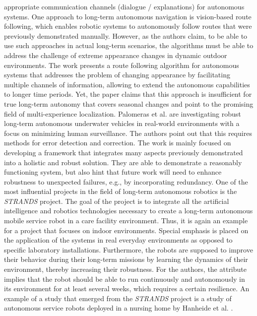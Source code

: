 \documentclass[english, master, utf8]{base/thesis_KBS}
\begin{document}
appropriate communication channels (dialogue / explanations) for autonomous systems.\newline
One approach to long-term autonomous navigation is vision-based route following, which enables robotic systems to autonomously follow routes that were previously demonstrated
manually. \cite{Paton:2016} However, as the authors claim, to be able to use such approaches in actual long-term scenarios, the algorithms must be able to address the challenge
of extreme appearance changes in dynamic outdoor environments. The work presents a route following algorithm for autonomous systems that addresses the problem of changing appearance
by facilitating multiple channels of information, allowing to extend the autonomous capabilities to longer time periods. Yet, the paper claims that this approach is insufficient for
true long-term autonomy that covers seasonal changes and point to the promising field of multi-experience localization.\newline
Palomeras et al. \cite{Palomeras:2016} are investigating robust long-term autonomous underwater vehicles in real-world environments with a focus on minimizing human surveillance.
The authors point out that this requires methods for error detection and correction. The work is mainly focused on developing a framework that integrates many aspects previously
demonstrated into a holistic and robust solution. They are able to demonstrate a reasonably functioning system, but also hint that future work will need to enhance robustness to
unexpected failures, e.g., by incorporating redundancy.\newline
One of the most influential projects in the field of long-term autonomous robotics is the \textit{STRANDS} \cite{Hawes:2017} project. The goal of the project is to integrate all the
artificial intelligence and robotics technologies necessary to create a long-term autonomous mobile service robot in a care facility environment. Thus, it is again an example for a project
that focuses on indoor environments. Special emphasis is placed on the application of the systems in real everyday environments as opposed to specific laboratory installations.
Furthermore, the robots are supposed to improve their behavior during their long-term missions by learning the dynamics of their environment, thereby increasing their robustness.
For the authors, the attribute  implies that the robot should be able to run continuously and autonomously in its environment for at least several weeks, which requires
a certain resilience.
An example of a study that emerged from the \textit{STRANDS} project is a study of autonomous service robots deployed in a nursing home by Hanheide et al. \cite{Hanheide:2017}.
\end{document}
